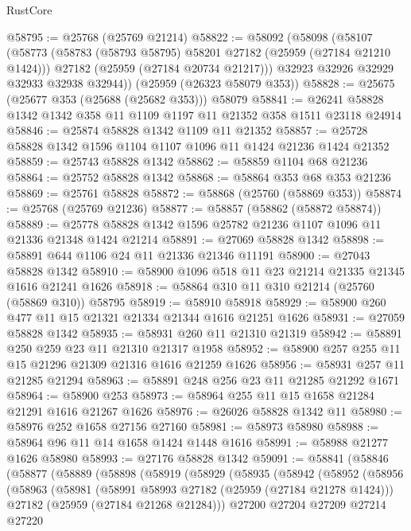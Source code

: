 \begin{lexlean}{RustCore}
\begin{coremodule}
@58795 := @25768 (@25769 @21214)
@58822 := @58092
    (@58098
      (@58107
        (@58773
          (@58783 (@58793 @58795) @58201 @27182 (@25959 (@27184 @21210 @1424)))
          @27182
          (@25959 (@27184 @20734 @21217)))
        @32923
        @32926
        @32929
        @32933
        @32938
        @32944))
    (@25959 (@26323 @58079 @353))
@58828 := @25675 (@25677 @353 (@25688 (@25682 @353))) @58079
@58841 := @26241 @58828 @1342 @1342 @358 @11 @1109 @1197 @11 @21352 @358 @1511 @23118 @24914
@58846 := @25874 @58828 @1342 @1109 @11 @21352
@58857 := @25728 @58828 @1342 @1596 @1104 @1107 @1096 @11 @1424 @21236 @1424 @21352
@58859 := @25743 @58828 @1342
@58862 := @58859 @1104 @68 @21236
@58864 := @25752 @58828 @1342
@58868 := @58864 @353 @68 @353 @21236
@58869 := @25761 @58828
@58872 := @58868 (@25760 (@58869 @353))
@58874 := @25768 (@25769 @21236)
@58877 := @58857 (@58862 (@58872 @58874))
@58889 := @25778 @58828 @1342 @1596 @25782 @21236 @1107 @1096 @11 @21336 @21348 @1424 @21214
@58891 := @27069 @58828 @1342
@58898 := @58891 @644 @1106 @24 @11 @21336 @21346 @11191
@58900 := @27043 @58828 @1342
@58910 := @58900 @1096 @518 @11 @23 @21214 @21335 @21345 @1616 @21241 @1626
@58918 := @58864 @310 @11 @310 @21214 (@25760 (@58869 @310)) @58795
@58919 := @58910 @58918
@58929 := @58900 @260 @477 @11 @15 @21321 @21334 @21344 @1616 @21251 @1626
@58931 := @27059 @58828 @1342
@58935 := @58931 @260 @11 @21310 @21319
@58942 := @58891 @250 @259 @23 @11 @21310 @21317 @1958
@58952 := @58900 @257 @255 @11 @15 @21296 @21309 @21316 @1616 @21259 @1626
@58956 := @58931 @257 @11 @21285 @21294
@58963 := @58891 @248 @256 @23 @11 @21285 @21292 @1671
@58964 := @58900 @253
@58973 := @58964 @255 @11 @15 @1658 @21284 @21291 @1616 @21267 @1626
@58976 := @26026 @58828 @1342 @11
@58980 := @58976 @252 @1658 @27156 @27160
@58981 := @58973 @58980
@58988 := @58964 @96 @11 @14 @1658 @1424 @1448 @1616
@58991 := @58988 @21277 @1626 @58980
@58993 := @27176 @58828 @1342
@59091 := @58841
    (@58846
      (@58877
        (@58889
          (@58898
            (@58919
              (@58929
                (@58935
                  (@58942
                    (@58952
                      (@58956
                        (@58963
                          (@58981
                            (@58991 @58993 @27182 (@25959 (@27184 @21278 @1424)))
                            @27182
                            (@25959 (@27184 @21268 @21284)))
                          @27200
                          @27204
                          @27209
                          @27214
                          @27220

\end{coremodule}
\end{lexlean}
